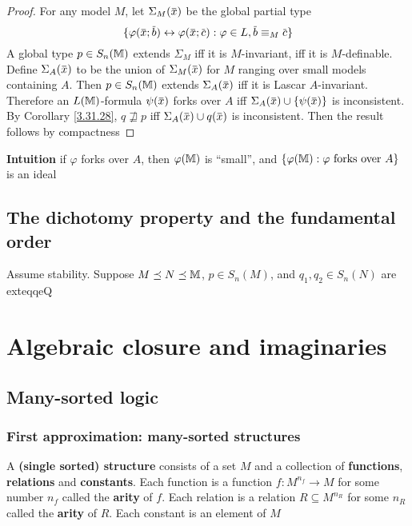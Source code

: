 \documentclass[11pt]{article}
\begin{document}
\begin{proof}
For any model \(M\), let \(\Sigma_M(\barx)\) be the global partial type
\begin{equation*}
\{\varphi(\barx;\barb)\leftrightarrow\varphi(\barx;\barc):\varphi\in L,\barb\equiv_M\barc\}
\end{equation*}
A global type \(p\in S_n(\mathbb{M})\) extends \(\Sigma_M\) iff it is \(M\)-invariant, iff it
is \(M\)-definable. Define \(\Sigma_A(\barx)\) to be the union of \(\Sigma_M(\barx)\) for \(M\) ranging
over small models containing \(A\). Then \(p\in S_n(\mathbb{M})\) extends \(\Sigma_A(\barx)\) iff it is
Lascar \(A\)-invariant. Therefore an \(L(\mathbb{M})\)-formula \(\psi(\barx)\) forks over \(A\)
iff \(\Sigma_A(\barx)\cup\{\psi(\barx)\}\) is inconsistent. By Corollary \ref{3.31.28}, \(q\not\sqsupseteq p\)
iff \(\Sigma_A(\barx)\cup q(\barx)\) is inconsistent. Then the result follows by compactness
\end{proof}




\textbf{Intuition} if \(\varphi\) forks over \(A\), then \(\varphi(\mathbb{M})\) is ``small'', and
\(\{\varphi(\mathbb{M}):\varphi\text{ forks over }A\}\) is an ideal
\subsection{The dichotomy property and the fundamental order}
\label{sec:org4ca095e}
\begin{lemma}
Assume stability. Suppose \(M\preceq N\preceq\mathbb{M}\), \(p\in S_n(M)\), and \(q_1,q_2\in S_n(N)\) are exteqqeQ
\end{lemma}
\section{Algebraic closure and imaginaries}
\label{sec:orgbae558a}
\subsection{Many-sorted logic}
\label{sec:orgea1f822}
\subsubsection{First approximation: many-sorted structures}
\label{sec:orgaf00e90}
\begin{definition}[]
A \textbf{(single sorted) structure} consists of a set \(M\) and a collection of \textbf{functions}, \textbf{relations} and
\textbf{constants}. Each function is a function \(f:M^{n_f}\to M\) for some number \(n_f\) called the \textbf{arity}
of \(f\). Each relation is a relation \(R\subseteq M^{n_R}\) for some \(n_R\) called the \textbf{arity} of \(R\).
Each constant is an element of \(M\)
\end{definition}
\end{document}
